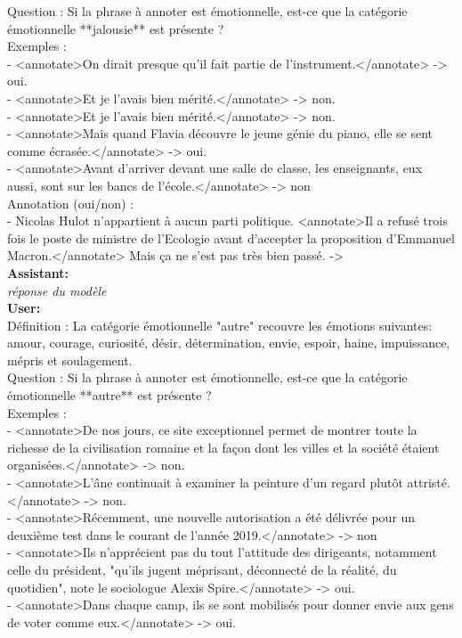 {Question : Si la phrase à annoter est émotionnelle, est-ce que la catégorie émotionnelle **jalousie** est présente ?\\

Exemples :\\
- <annotate>On dirait presque qu'il fait partie de l'instrument.</annotate> -> oui.\\
- <annotate>Et je l'avais bien mérité.</annotate> -> non.\\
- <annotate>Et je l'avais bien mérité.</annotate> -> non.\\
- <annotate>Mais quand Flavia découvre le jeune génie du piano, elle se sent comme écrasée.</annotate> -> oui.\\
- <annotate>Avant d'arriver devant une salle de classe, les enseignants, eux aussi, sont sur les bancs de l'école.</annotate> -> non\\

Annotation (oui/non) :\\
- Nicolas Hulot n’appartient à aucun parti politique. <annotate>Il a refusé trois fois le poste de ministre de l’Ecologie avant d’accepter la proposition d’Emmanuel Macron.</annotate> Mais ça ne s’est pas très bien passé.  -> \\

\textbf{Assistant:}\\
\textit{réponse du modèle}\\

\textbf{User:}\\
Définition : La catégorie émotionnelle "autre" recouvre les émotions suivantes: amour, courage, curiosité, désir, détermination, envie, espoir, haine, impuissance, mépris et soulagement.\\

Question : Si la phrase à annoter est émotionnelle, est-ce que la catégorie émotionnelle **autre** est présente ?\\

Exemples :\\
- <annotate>De nos jours, ce site exceptionnel permet de montrer toute la richesse de la civilisation romaine et la façon dont les villes et la société étaient organisées.</annotate> -> non.\\
- <annotate>L'âne continuait à examiner la peinture d'un regard plutôt attristé.</annotate> -> non.\\
- <annotate>Récemment, une nouvelle autorisation a été délivrée pour un deuxième test dans le courant de l'année 2019.</annotate> -> non\\
- <annotate>Ils n'apprécient pas du tout l'attitude des dirigeants, notamment celle du président, "qu'ils jugent méprisant, déconnecté de la réalité, du quotidien", note le sociologue Alexis Spire.</annotate> -> oui.\\
- <annotate>Dans chaque camp, ils se sont mobilisés pour donner envie aux gens de voter comme eux.</annotate> -> oui.\\

}
